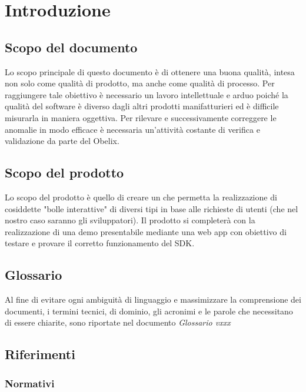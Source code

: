 
\section{Introduzione}
\subsection{Scopo del documento}


Lo scopo principale di questo documento è di ottenere una buona
qualità, intesa non solo come qualità di prodotto, ma anche come
qualità di processo. Per raggiungere tale obiettivo è necessario un
lavoro intellettuale e arduo poiché la qualità del software è diverso
dagli altri prodotti manifatturieri ed è difficile misurarla in
maniera oggettiva. Per rilevare e successivamente correggere le
anomalie in modo efficace è necessaria un'attività costante di
verifica e validazione da parte del  Obelix. 


\subsection{Scopo del prodotto}

Lo scopo del prodotto è quello di creare un  che permetta la
realizzazione di cosiddette "bolle interattive" di diversi tipi in
base alle richieste di utenti (che nel nostro caso saranno gli
sviluppatori). Il prodotto si completerà con la realizzazione di una
demo presentabile mediante una web app con obiettivo di testare e
provare il corretto funzionamento del SDK. 

\subsection{Glossario}
Al fine di evitare ogni ambiguità di linguaggio e massimizzare la comprensione dei documenti, i termini tecnici, di dominio, gli acronimi e le parole che necessitano di essere chiarite, sono riportate nel documento \emph{Glossario vxxx}

\subsection{Riferimenti}

\subsubsection{Normativi}

